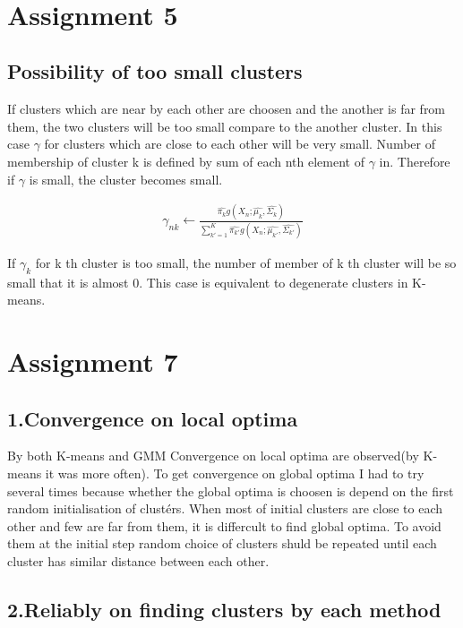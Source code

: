 \documentclass[a4paper,11pt]{article}
\begin{document}
\begin{verbatim}


\end{verbatim}

\section*{Assignment 5}
\subsection*{Possibility of too small clusters}

If clusters which are near by each other are choosen and the another is far from them, the two clusters will be too small compare to the another cluster. In this case $\gamma$ for clusters which are close to each other will be very small. Number of membership of cluster k is defined by sum of each nth element of $\gamma$ in. Therefore if $\gamma$ is small, the cluster becomes small.

\begin{eqnarray*}
\gamma_{nk} \leftarrow \frac{\hat{\pi_k}g(X_{n};\hat{\mu_{k}},\hat{\Sigma_{k}})}{\sum^{K}_{k'=1}\hat{\pi_{k'}}g(X_{n};\hat{\mu_{k'}},\hat{\Sigma_{k'}})}
\end{eqnarray*}

If $\gamma_k$ for k th cluster is too small, the number of member of k th cluster will be so small that it is almost 0. This case is equivalent to degenerate clusters in K-means.

\section*{Assignment 7}

\subsection*{1.Convergence on local optima}
By both K-means and GMM Convergence on local optima are observed(by K-means it was more often). To get convergence on global optima I had to try several times because whether the global optima is choosen is depend on the first random initialisation of clustérs. When most of initial clusters are close to each other and few are far from them, it is differcult to find global optima. To avoid them at the initial step random choice of clusters shuld be repeated until each cluster has similar distance between each other. 

\subsection*{2.Reliably on finding clusters by each method}
\end{document}
